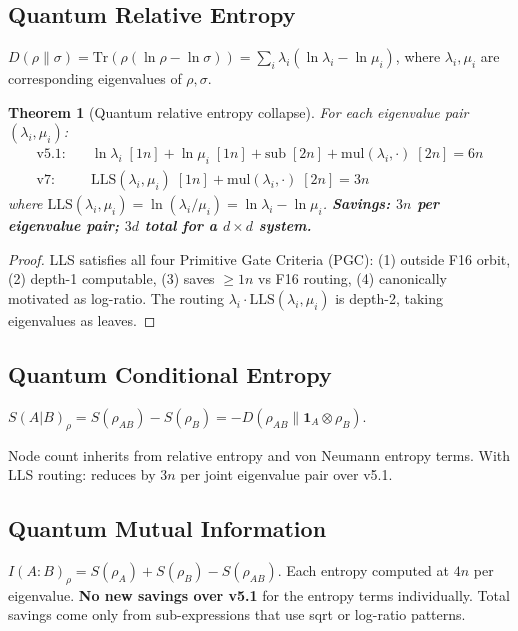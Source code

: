 \documentclass[11pt]{article}
\newtheorem{theorem}{Theorem}
\begin{document}
\subsection{Quantum Relative Entropy}

$D(\rho\|\sigma)=\mathrm{Tr}(\rho(\ln\rho-\ln\sigma))=\sum_i\lambda_i(\ln\lambda_i-\ln\mu_i)$,
where $\lambda_i,\mu_i$ are corresponding eigenvalues of $\rho,\sigma$.

\begin{theorem}[Quantum relative entropy collapse]
For each eigenvalue pair $(\lambda_i,\mu_i)$:
\begin{align*}
\text{v5.1:} &\quad \ln\lambda_i\;[1n] + \ln\mu_i\;[1n] + \mathrm{sub}\;[2n] + \mathrm{mul}(\lambda_i,\cdot)\;[2n] = 6n \\
\text{v7:}   &\quad \mathrm{LLS}(\lambda_i,\mu_i)\;[1n] + \mathrm{mul}(\lambda_i,\cdot)\;[2n] = 3n
\end{align*}
where $\mathrm{LLS}(\lambda_i,\mu_i)=\ln(\lambda_i/\mu_i)=\ln\lambda_i-\ln\mu_i$.
\textbf{Savings: $3n$ per eigenvalue pair; $3d$ total for a $d\times d$ system.}
\end{theorem}

\begin{proof}
LLS satisfies all four Primitive Gate Criteria (PGC): (1) outside F16 orbit, (2) depth-1 computable,
(3) saves $\geq 1n$ vs F16 routing, (4) canonically motivated as log-ratio.
The routing $\lambda_i\cdot\mathrm{LLS}(\lambda_i,\mu_i)$ is depth-2, taking eigenvalues as leaves.
\end{proof}

\subsection{Quantum Conditional Entropy}

$S(A|B)_\rho = S(\rho_{AB})-S(\rho_B) = -D(\rho_{AB}\|\mathbf{1}_A\otimes\rho_B)$.

Node count inherits from relative entropy and von Neumann entropy terms.
With LLS routing: reduces by $3n$ per joint eigenvalue pair over v5.1.

\subsection{Quantum Mutual Information}

$I(A:B)_\rho = S(\rho_A)+S(\rho_B)-S(\rho_{AB})$.
Each entropy computed at $4n$ per eigenvalue. \textbf{No new savings over v5.1} for
the entropy terms individually. Total savings come only from sub-expressions
that use sqrt or log-ratio patterns.
\end{document}
